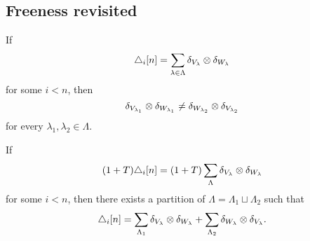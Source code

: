 \subsection{Freeness revisited}


\begin{lemma} \label{lemma: freeness recasted}
	If
	\[
	\triangle_i [n] = \sum_{\lambda \in \Lambda} \delta_{V_\lambda} \otimes \delta_{W_\lambda}
	\]
	for some $i < n$, then
	\[
	\delta_{V_{\lambda_1}} \otimes \delta_{W_{\lambda_1}} \neq
	\delta_{W_{\lambda_2}} \otimes \delta_{V_{\lambda_2}}
	\]
	for every $\lambda_1, \lambda_2 \in \Lambda$.
\end{lemma}


\begin{lemma} \label{lemma: (1+T) triangle = 0 implies triangle = 0}
    If
    \[
    (1 + T) \triangle_i [n] = (1 + T) \sum_{\Lambda} \delta_{V_\lambda} \otimes \delta_{W_\lambda}
    \]
    for some $i < n$, then there exists a partition of $\Lambda = \Lambda_1 \sqcup \Lambda_2$ such that
    \begin{equation} \label{equation: splitting after 1+T}
    \triangle_i [n] = \sum_{\Lambda_1} \delta_{V_\lambda} \otimes \delta_{W_\lambda} + \sum_{\Lambda_2} \delta_{W_\lambda} \otimes \delta_{V_\lambda}.
    \end{equation}
\end{lemma}


